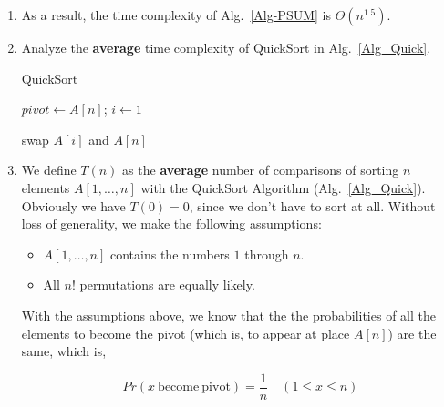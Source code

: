 \documentclass[12pt,a4paper]{article}
\makeatletter
\newtheorem*{solution}{Solution}
\theoremstyle{definition}
\renewenvironment{solution}[1][Solution] {\par\pushQED{\qed}\normalfont\topsep6\p@\@plus6\p@\relax\trivlist\item[\hskip\labelsep\bfseries#1\@addpunct{.}]\ignorespaces}{\popQED\endtrivlist\@endpefalse} \makeatother
\makeatother
\begin{document}
\begin{enumerate}
\begin{solution}
        As a result, the time complexity of Alg.~\ref{Alg-PSUM} is $\Theta(n^{1.5})$.
    \end{solution}

    \item
    Analyze the \textbf{average} time complexity of QuickSort in Alg.~\ref{Alg_Quick}.

    \begin{minipage}[t]{0.8\textwidth}
    \begin{algorithm}[H]

      \BlankLine
      \caption{QuickSort}\label{Alg_Quick}


      $pivot \leftarrow A[n]$; $i \leftarrow 1$\;

      swap $A[i]$ and $A[n]$\;

    \end{algorithm}
    \end{minipage}

    \begin{solution}
        We define $T(n)$ as the \textbf{average} number of comparisons of sorting $n$ elements $A[1,\dots,n]$ with the QuickSort Algorithm (Alg.~\ref{Alg_Quick}). Obviously we have $T(0) = 0$, since we don't have to sort at all. Without loss of generality, we make the following assumptions:

        \begin{itemize}
            \item $A[1,\dots,n]$ contains the numbers $1$ through $n$.
            \item All $n!$ permutations are equally likely.
        \end{itemize}

        With the assumptions above, we know that the the probabilities of all the elements to become the pivot (which is, to appear at place $A[n]$) are the same, which is,

        \begin{equation}
            Pr(x \mathrm{\ become\ pivot}) = \frac{1}{n} \quad (1 \leq x \leq n)
            \label{eq:2.1}
        \end{equation}


\end{solution}
\end{enumerate}
\end{document}

